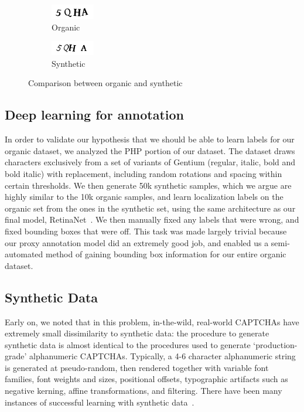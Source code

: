 \documentclass[twocolumn,10pt]{article}
\begin{document}
\begin{center}
\begin{figure}
\centering
\begin{subfigure}{.5\columnwidth}
  \centering
  \includegraphics[width=.4\linewidth]{bw.PNG}
  \caption{Organic}
  \label{fig:sub1}
\end{subfigure}%
\begin{subfigure}{.5\columnwidth}
  \centering
  \includegraphics[width=.4\linewidth]{synthbw.png}
  \caption{Synthetic}
  \label{fig:sub2}
\end{subfigure}
\caption{Comparison between organic and synthetic}
\label{fig:test}
\end{figure}
\end{center}

\subsection{Deep learning for annotation}
In order to validate our hypothesis that we should be able to learn labels for our organic dataset, we analyzed the PHP portion of our dataset. The dataset draws characters exclusively from a set of variants of Gentium (regular, italic, bold and bold italic) with replacement, including random rotations and spacing within certain thresholds. We then generate 50k synthetic samples, which we argue are highly similar to the 10k organic samples, and learn localization labels on the organic set from the ones in the synthetic set, using the same architecture as our final model, RetinaNet~\cite{fl}. We then manually fixed any labels that were wrong, and fixed bounding boxes that were off. This task was made largely trivial because our proxy annotation model did an extremely good job, and enabled us a semi-automated method of gaining bounding box information for our entire organic dataset.

\subsection{Synthetic Data}
Early on, we noted that in this problem, in-the-wild, real-world CAPTCHAs have extremely small dissimilarity to synthetic data: the procedure to generate synthetic data is almost identical to the procedures used to generate ‘production-grade’ alphanumeric CAPTCHAs. Typically, a 4-6 character alphanumeric string is generated at pseudo-random, then rendered together with variable font families, font weights and sizes, positional offsets, typographic artifacts such as negative kerning, affine transformations, and filtering. There have been many instances of successful learning with synthetic data~\cite{readingtext,synth}.
\end{document}
